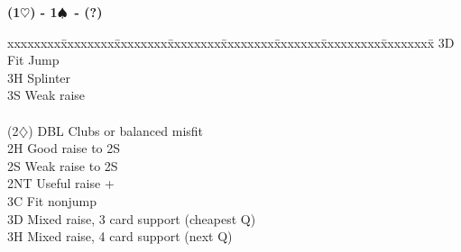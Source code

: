 \documentclass[10pt]{article}
\renewcommand{\d}{$\diamondsuit$}
\newcommand{\h}{$\heartsuit$}
\newcommand{\s}{$\spadesuit$}
\newenvironment{bidtable}[1][]
{\textbf{#1}
  \begin{adjustwidth}{1em}{}
    \addvspace{2pt}
    \begin{tabbing}
      xxxxxxxx\=xxxxxxxx\=xxxxxxxx\=xxxxxxxx\=xxxxxxxx\=xxxxxxx\=xxxxxxxxx\=xxxxxxxx\=\kill}
{\end{tabbing}\end{adjustwidth}\bigskip}%
\begin{document}
\begin{bidtable}[(1\h) - 1\s\ - (?)]
      \> 3D     \> Fit Jump                                                 \\
      \> 3H     \> Splinter                                                 \\
      \> 3S     \> Weak raise                                               \\
                                                                            \\
(2\d) \> DBL    \> Clubs or balanced misfit                                 \\
      \> 2H     \> Good raise to 2S                                         \\
      \> 2S     \> Weak raise to 2S                                         \\
      \> 2NT    \> Useful raise +                                           \\
      \> 3C     \> Fit nonjump                                              \\
      \> 3D     \> Mixed raise, 3 card support (cheapest Q)                 \\
      \> 3H     \> Mixed raise, 4 card support (next Q)
\end{bidtable}
\end{document}
